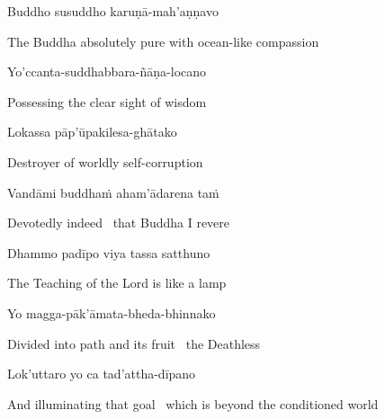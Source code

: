 Buddho susuddho karuṇā-mah'aṇṇavo

\begin{english}
  The Buddha absolutely pure with ocean-like compassion
\end{english}

Yo'ccanta-suddhabbara-ñāṇa-locano

\begin{english}
  Possessing the clear sight of wisdom
\end{english}

Lokassa pāp'ūpakilesa-ghātako

\begin{english}
  Destroyer of worldly self-corruption
\end{english}

Vandāmi buddhaṁ aham'ādarena taṁ

\begin{english}
  Devotedly indeed \breathmark\ that Buddha I revere
\end{english}

Dhammo padīpo viya tassa satthuno

\begin{english}
  The Teaching of the Lord is like a lamp\makeatletter\hyperlink{endnote8-appendix}\makeatother
\end{english}

Yo magga-pāk'āmata-bheda-bhinnako

\begin{english}
  Divided into path and its fruit \breathmark\ the Deathless\makeatletter\hyperlink{endnote9-appendix}\makeatother
\end{english}

Lok'uttaro yo ca tad'attha-dīpano

\begin{english}
  And illuminating that goal \breathmark\ which is beyond the conditioned world\makeatletter\hyperlink{endnote10-appendix}\makeatother
\end{english}

